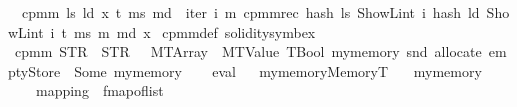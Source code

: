 \begin{isabellebody}
\isanewline
\ \ {\isachardoublequoteopen}cpm{}m\ l\isactrlsub s\ l\isactrlsub d\ x\ t\ m\isactrlsub s\ m\isactrlsub d\ {\isacharequal}{\kern0pt}\ iter{\isacharprime}{\kern0pt}\ {\isacharparenleft}{\kern0pt}{\isasymlambda}i\ m{\isachardot}{\kern0pt}\ cpm{}mrec\ {\isacharparenleft}{\kern0pt}hash\ l\isactrlsub s\ {\isacharparenleft}{\kern0pt}ShowL\isactrlsub i\isactrlsub n\isactrlsub t\ i{\isacharparenright}{\kern0pt}{\isacharparenright}{\kern0pt}\ {\isacharparenleft}{\kern0pt}hash\ l\isactrlsub d\ {\isacharparenleft}{\kern0pt}ShowL\isactrlsub i\isactrlsub n\isactrlsub t\ i{\isacharparenright}{\kern0pt}{\isacharparenright}{\kern0pt}\ t\ m\isactrlsub s\ m{\isacharparenright}{\kern0pt}\ m\isactrlsub d\ x{\isachardoublequoteclose}\isanewline
\isanewline
{}\isamarkupfalse%
\ cpm{}m{\isacharunderscore}{\kern0pt}def\ {\isacharbrackleft}{\kern0pt}solidity{\isacharunderscore}{\kern0pt}symbex{\isacharbrackright}{\kern0pt}%
\isadelimdocument
%
\endisadelimdocument
%
\isatagdocument
%
\isamarkuptrue%
%
\endisatagdocument
{\isafolddocument}%
%
\isadelimdocument
%
\endisadelimdocument
{}\isamarkupfalse%
\ {\isachardoublequoteopen}cpm{}m\ {\isacharparenleft}{\kern0pt}STR\ {\isacharprime}{\kern0pt}{\isacharprime}{\kern0pt}{}{\isacharprime}{\kern0pt}{\isacharprime}{\kern0pt}{\isacharparenright}{\kern0pt}\ {\isacharparenleft}{\kern0pt}STR\ {\isacharprime}{\kern0pt}{\isacharprime}{\kern0pt}{}{\isacharprime}{\kern0pt}{\isacharprime}{\kern0pt}{\isacharparenright}{\kern0pt}\ {}\ {\isacharparenleft}{\kern0pt}MTArray\ {}\ {\isacharparenleft}{\kern0pt}MTValue\ TBool{\isacharparenright}{\kern0pt}{\isacharparenright}{\kern0pt}\ mymemory\ {\isacharparenleft}{\kern0pt}snd\ {\isacharparenleft}{\kern0pt}allocate\ emptyStore{\isacharparenright}{\kern0pt}{\isacharparenright}{\kern0pt}\ {\isacharequal}{\kern0pt}\ Some\ mymemory{\isachardoublequoteclose}\isanewline
%
\isadelimproof
\ \ %
\endisadelimproof
%
\isatagproof
{}\isamarkupfalse%
\ eval%
\endisatagproof
{\isafoldproof}%
%
\isadelimproof
\ \isanewline
%
\endisadelimproof
\isanewline
{}\isamarkupfalse%
\ mymemory{}{\isacharcolon}{\kern0pt}{\isacharcolon}{\kern0pt}MemoryT\isanewline
\ \ \ {\isachardoublequoteopen}mymemory{}\ {\isasymequiv}\isanewline
\ \ \ \ {\isasymlparr}mapping\ {\isacharequal}{\kern0pt}\ fmap{\isacharunderscore}{\kern0pt}of{\isacharunderscore}{\kern0pt}list\isanewline

\end{isabellebody}
